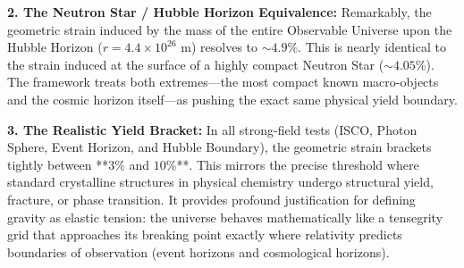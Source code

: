 \documentclass[11pt, letterpaper, openany]{book}
\begin{document}
\textbf{2. The Neutron Star / Hubble Horizon Equivalence:}
Remarkably, the geometric strain induced by the mass of the entire Observable Universe upon the Hubble Horizon ($r = 4.4 \times 10^{26}$ m) resolves to $\sim 4.9\%$. This is nearly identical to the strain induced at the surface of a highly compact Neutron Star ($\sim 4.05\%$). The framework treats both extremes—the most compact known macro-objects and the cosmic horizon itself—as pushing the exact same physical yield boundary.

\textbf{3. The Realistic Yield Bracket:}
In all strong-field tests (ISCO, Photon Sphere, Event Horizon, and Hubble Boundary), the geometric strain brackets tightly between **$3\%$ and $10\%$**. This mirrors the precise threshold where standard crystalline structures in physical chemistry undergo structural yield, fracture, or phase transition. It provides profound justification for defining gravity as elastic tension: the universe behaves mathematically like a tensegrity grid that approaches its breaking point exactly where relativity predicts boundaries of observation (event horizons and cosmological horizons).
\end{document}
